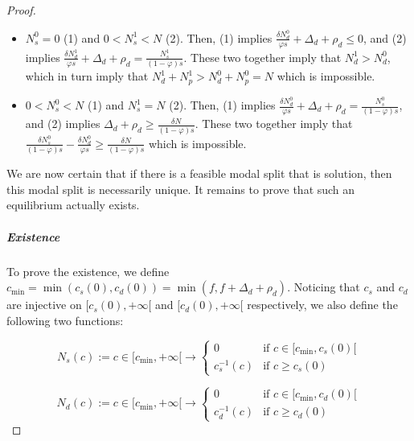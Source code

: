 \documentclass[english, a4paper]{article}
\theoremstyle{plain}
\theoremstyle{definition}
\theoremstyle{remark}
\begin{document}
\begin{proof}
\begin{itemize}
        \item $N_s^0 = 0$ (1) and $0 < N_s^1 < N$ (2). Then, (1) implies $\frac{\delta N_d^0}{\varphi s} + \Delta _d + \rho _d \leq 0$, and (2) implies $\frac{\delta N_d^1}{\varphi s} + \Delta _d + \rho _d = \frac{N_s^1}{(1-\varphi)s}$. These two together imply that $N_d^1 > N_d^0$, which in turn imply that $N_d^1 + N_p^1 > N_d^0 + N_p^0 = N$ which is impossible.
        \item $0 < N_s^0 < N$ (1) and $N_s^1 = N$ (2). Then, (1) implies $\frac{\delta N_d^0}{\varphi s} + \Delta _d + \rho _d = \frac{N_s^0}{(1-\varphi)s}$, and (2) implies $\Delta _d + \rho _d \geq \frac{\delta N}{(1-\varphi)s}$. These two together imply that $\frac{\delta N_s^0}{(1-\varphi)s} - \frac{\delta N_d^0}{\varphi s} \geq \frac{\delta N}{(1-\varphi)s}$ which is impossible.
    \end{itemize}

    We are now certain that if there is a feasible modal split that is solution, then this modal split is necessarily unique. It remains to prove that such an equilibrium actually exists.

    \item \subparagraph{Existence}
    
    To prove the existence, we define $c_{\text{min}} = \min (c_s(0), c_d(0)) = \min (f, f + \Delta _d + \rho _d)$. Noticing that $c_s$ and $c_d$ are injective on $[c_s(0), +\infty[$ and $[c_d(0), +\infty[$ respectively, we also define the following two functions:
    
    \begin{equation}
        N_s(c):= c\in [c_{\text{min}}, +\infty[ \longrightarrow \left\{
        \begin{array}{lr}
            0 & \text{if } c \in [c_{\text{min}}, c_s(0)[\\
            c_s^{-1}(c) & \text{if } c \geq c_s(0)
        \end{array}
        \right.
    \end{equation}

    \begin{equation}
        N_d(c):= c\in [c_{\text{min}}, +\infty[ \longrightarrow \left\{
        \begin{array}{lr}
            0 & \text{if } c \in [c_{\text{min}}, c_d(0)[\\
            c_d^{-1}(c) & \text{if } c \geq c_d(0)
        \end{array}
        \right.
    \end{equation}


\end{proof}
\end{document}
